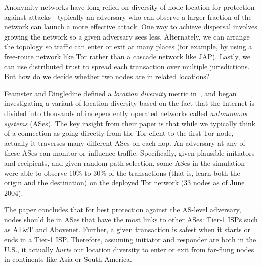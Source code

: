 \documentclass{llncs}
\begin{document}
Anonymity networks have long relied on diversity of node location for
protection against attacks---typically an adversary who can observe a
larger fraction of the network can launch a more effective attack. One
way to achieve dispersal involves growing the network so a given adversary
sees less. Alternately, we can arrange the topology so traffic can enter
or exit at many places (for example, by using a free-route network
like Tor rather than a cascade network like JAP). Lastly, we can use
distributed trust to spread each transaction over multiple jurisdictions.
But how do we decide whether two nodes are in related locations?

Feamster and Dingledine defined a \emph{location diversity} metric
in~\cite{feamster:wpes2004}, and began investigating a variant of location
diversity based on the fact that the Internet is divided into thousands of
independently operated networks called {\em autonomous systems} (ASes).
The key insight from their paper is that while we typically think of a
connection as going directly from the Tor client to the first Tor node,
actually it traverses many different ASes on each hop. An adversary at
any of these ASes can monitor or influence traffic. Specifically, given
plausible initiators and recipients, and given random path selection,
some ASes in the simulation were able to observe 10\% to 30\% of the
transactions (that is, learn both the origin and the destination) on
the deployed Tor network (33 nodes as of June 2004).

The paper concludes that for best protection against the AS-level
adversary, nodes should be in ASes that have the most links to other ASes:
Tier-1 ISPs such as AT\&T and Abovenet. Further, a given transaction
is safest when it starts or ends in a Tier-1 ISP\@. Therefore, assuming
initiator and responder are both in the U.S., it actually \emph{hurts}
our location diversity to enter or exit from far-flung nodes in
continents like Asia or South America.
\end{document}
